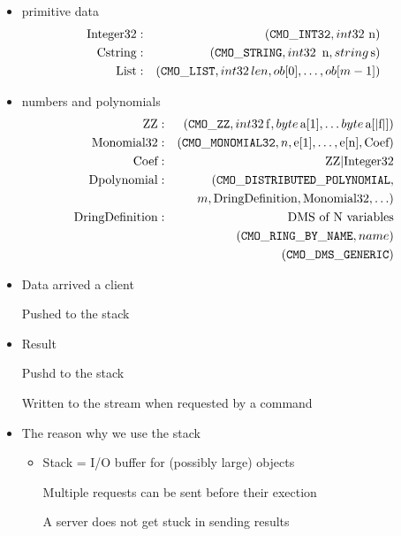 \begin{slide}{}

\begin{itemize}
\item primitive data
\begin{eqnarray*}
\mbox{Integer32} &:& ({\tt CMO\_INT32}, {\sl int32}\ \mbox{n}) \\
\mbox{Cstring}&:& ({\tt CMO\_STRING},{\sl int32}\,  \mbox{ n}, {\sl string}\, \mbox{s}) \\
\mbox{List} &:& ({\tt CMO\_LIST}, {\sl int32}\, len, ob[0], \ldots,ob[m-1])
\end{eqnarray*}

\item numbers and polynomials
\begin{eqnarray*}
\mbox{ZZ}         &:& ({\tt CMO\_ZZ},{\sl int32}\, {\rm f}, {\sl byte}\, \mbox{a[1]}, \ldots
{\sl byte}\, \mbox{a[$|$f$|$]} ) \\
\mbox{Monomial32}&:& ({\tt CMO\_MONOMIAL32}, n, \mbox{e[1]}, \ldots, \mbox{e[n]}, \mbox{Coef}) \\
\mbox{Coef}&:& \mbox{ZZ} | \mbox{Integer32} \\
\mbox{Dpolynomial}&:& ({\tt CMO\_DISTRIBUTED\_POLYNOMIAL},\\
                  & & m, \mbox{DringDefinition}, \mbox{Monomial32}, \ldots)\\
\mbox{DringDefinition}
                 &:& \mbox{DMS of N variables} \\
		 & & ({\tt CMO\_RING\_BY\_NAME}, name) \\
                 & & ({\tt CMO\_DMS\_GENERIC}) \\
\end{eqnarray*}
\end{itemize}
\end{slide}

\begin{slide}{}

\begin{itemize}
\item Data arrived a client

Pushed to the stack

\item Result

Pushd to the stack

Written to the stream when requested by a command

\item The reason why we use the stack

\begin{itemize}
\item Stack = I/O buffer for (possibly large) objects

Multiple requests can be sent before their exection

A server does not get stuck in sending results
\end{itemize}
\end{itemize}
\end{slide}

